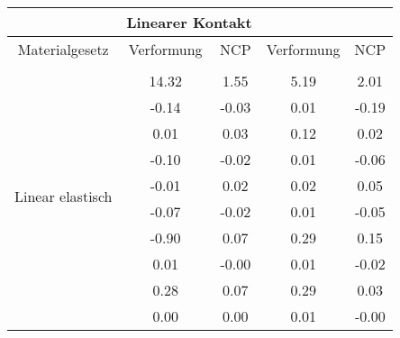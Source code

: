 \begin{table} 
\centering 
\begin{tabular}{c|cc|cc|} 
\cline{2-5} 
 & \multicolumn{2}{|c|}{Linearer Kontakt} &  \\ 
\hline 
\multicolumn{1}{|c|}{Materialgesetz} & \multicolumn{1}{c|}{Verformung} & \multicolumn{1}{c|}{NCP} & \multicolumn{1}{c|}{Verformung} & \multicolumn{1}{c|}{NCP} \\ 
\hline 
\multicolumn{1}{|c|}{\multirow{17}{*}{Linear elastisch}} &\multicolumn{1}{|c|}{} & \multicolumn{1}{|c|}{} & \multicolumn{1}{|c|}{} & \multicolumn{1}{|c|}{} \\ 
\multicolumn{1}{|c|}{} & \multicolumn{1}{|c|}{     14.32} & \multicolumn{1}{|c|}{      1.55} & \multicolumn{1}{|c|}{      5.19} & \multicolumn{1}{|c|}{      2.01} \\ 
\multicolumn{1}{|c|}{} & \multicolumn{1}{|c|}{     -0.14} & \multicolumn{1}{|c|}{     -0.03} & \multicolumn{1}{|c|}{      0.01} & \multicolumn{1}{|c|}{     -0.19} \\ 
\multicolumn{1}{|c|}{} & \multicolumn{1}{|c|}{      0.01} & \multicolumn{1}{|c|}{      0.03} & \multicolumn{1}{|c|}{      0.12} & \multicolumn{1}{|c|}{      0.02} \\ 
\multicolumn{1}{|c|}{} & \multicolumn{1}{|c|}{     -0.10} & \multicolumn{1}{|c|}{     -0.02} & \multicolumn{1}{|c|}{      0.01} & \multicolumn{1}{|c|}{     -0.06} \\ 
\multicolumn{1}{|c|}{} & \multicolumn{1}{|c|}{     -0.01} & \multicolumn{1}{|c|}{      0.02} & \multicolumn{1}{|c|}{      0.02} & \multicolumn{1}{|c|}{      0.05} \\ 
\multicolumn{1}{|c|}{} & \multicolumn{1}{|c|}{     -0.07} & \multicolumn{1}{|c|}{     -0.02} & \multicolumn{1}{|c|}{      0.01} & \multicolumn{1}{|c|}{     -0.05} \\ 
\multicolumn{1}{|c|}{} & \multicolumn{1}{|c|}{     -0.90} & \multicolumn{1}{|c|}{      0.07} & \multicolumn{1}{|c|}{      0.29} & \multicolumn{1}{|c|}{      0.15} \\ 
\multicolumn{1}{|c|}{} & \multicolumn{1}{|c|}{      0.01} & \multicolumn{1}{|c|}{     -0.00} & \multicolumn{1}{|c|}{      0.01} & \multicolumn{1}{|c|}{     -0.02} \\ 
\multicolumn{1}{|c|}{} & \multicolumn{1}{|c|}{      0.28} & \multicolumn{1}{|c|}{      0.07} & \multicolumn{1}{|c|}{      0.29} & \multicolumn{1}{|c|}{      0.03} \\ 
\multicolumn{1}{|c|}{} & \multicolumn{1}{|c|}{      0.00} & \multicolumn{1}{|c|}{      0.00} & \multicolumn{1}{|c|}{      0.01} & \multicolumn{1}{|c|}{     -0.00} \\ 

\end{tabular}
\end{table}
